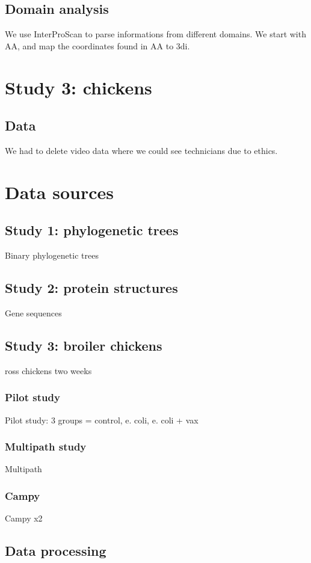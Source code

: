 \subsection{Domain analysis}
We use InterProScan to parse informations from different domains. We start with AA, and map the coordinates found in AA to 3di.

\section{Study 3: chickens}
\subsection{Data}
We had to delete video data where we could see technicians due to ethics.

\section{Data sources}
\subsection{Study 1: phylogenetic trees}
Binary phylogenetic trees
\subsection{Study 2: protein structures}
Gene sequences
\subsection{Study 3: broiler chickens}
ross chickens
two weeks
\subsubsection{Pilot study}
Pilot study: 3 groups = control, e. coli, e. coli + vax
\subsubsection{Multipath study}
Multipath
\subsubsection{Campy}
Campy x2


\subsection{Data processing}